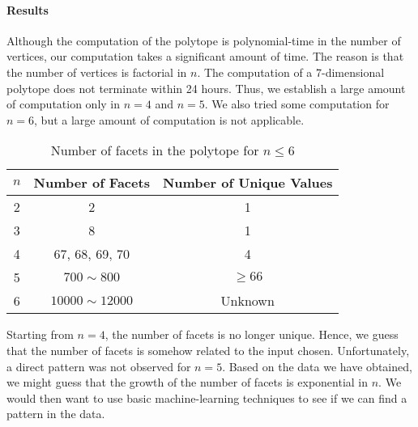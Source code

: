 \documentclass[12pt,letterpaper]{article}
\begin{document}
\paragraph{Results}
Although the computation of the polytope is polynomial-time in the number of vertices, our computation takes 
a significant amount of time. The reason is that the number of vertices is factorial in $n$. 
The computation of a 7-dimensional polytope does not terminate within 24 hours. Thus, we establish a large amount of 
computation only in $n = 4$ and $n = 5$. We also tried some computation for $n = 6$, but a large amount of computation 
is not applicable. 
\begin{table}[ht]
    \centering
    \begin{tabular}{||c | c | c ||}
        \hline 
        $n$ & Number of Facets & Number of Unique Values\\
        \hline 
        \hline 
 2 & 2 & 1\\
        \hline 
 3 & 8 & 1\\
        \hline 
 4 & 67, 68, 69, 70 & 4\\
        \hline 
 5 & $700 \sim 800$ & $\geq 66$\\
        \hline 
 6 & $10000 \sim 12000$  & Unknown\\
        \hline 
    \end{tabular}
    \caption{Number of facets in the polytope for $n \leq 6$}
\end{table}
Starting from $n = 4$, the number of facets is no longer unique. 
Hence, we guess that the number of facets is somehow related to the input chosen. 
Unfortunately, a direct pattern was not observed for $n=5$. 
Based on the data we have obtained, we might guess that the growth of the number of facets is exponential in $n$. 
We would then want to use basic machine-learning techniques to see if we can find a pattern in the data.
\end{document}
